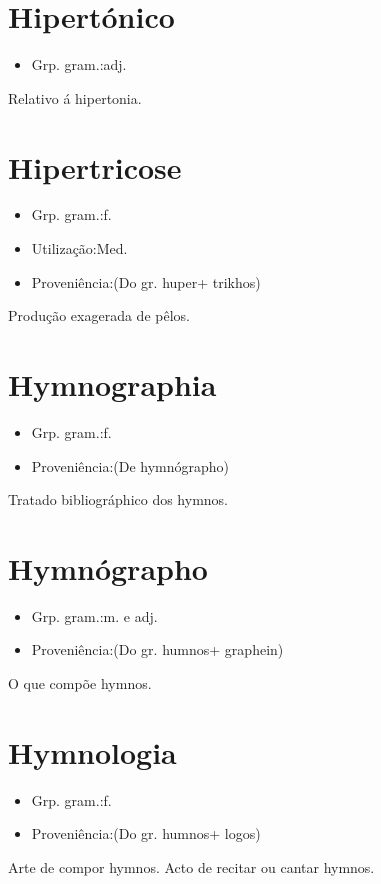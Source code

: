 \documentclass{article}
\begin{document}
\section{Hipertónico}
\begin{itemize}
\item {Grp. gram.:adj.}
\end{itemize}
Relativo á hipertonia.
\section{Hipertricose}
\begin{itemize}
\item {Grp. gram.:f.}
\end{itemize}
\begin{itemize}
\item {Utilização:Med.}
\end{itemize}
\begin{itemize}
\item {Proveniência:(Do gr. \textunderscore huper\textunderscore  + \textunderscore trikhos\textunderscore )}
\end{itemize}
Produção exagerada de pêlos.
\section{Hymnographia}
\begin{itemize}
\item {Grp. gram.:f.}
\end{itemize}
\begin{itemize}
\item {Proveniência:(De \textunderscore hymnógrapho\textunderscore )}
\end{itemize}
Tratado bibliográphico dos hymnos.
\section{Hymnógrapho}
\begin{itemize}
\item {Grp. gram.:m.  e  adj.}
\end{itemize}
\begin{itemize}
\item {Proveniência:(Do gr. \textunderscore humnos\textunderscore  + \textunderscore graphein\textunderscore )}
\end{itemize}
O que compõe hymnos.
\section{Hymnologia}
\begin{itemize}
\item {Grp. gram.:f.}
\end{itemize}
\begin{itemize}
\item {Proveniência:(Do gr. \textunderscore humnos\textunderscore  + \textunderscore logos\textunderscore )}
\end{itemize}
Arte de compor hymnos.
Acto de recitar ou cantar hymnos.
\end{document}
